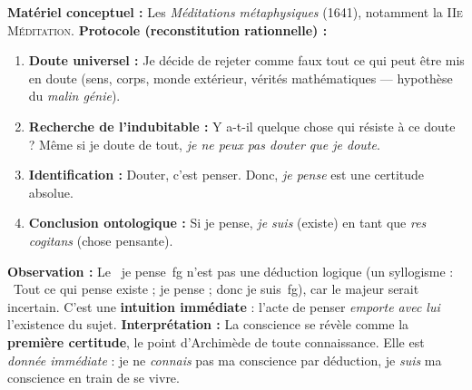 \documentclass[11pt]{article}
\begin{document}
\begin{experience}
\textbf{Matériel conceptuel :} Les \emph{Méditations métaphysiques} (1641), notamment la \textsc{IIe Méditation}.
\textbf{Protocole (reconstitution rationnelle) :}
\begin{enumerate}
    \item \textbf{Doute universel :} Je décide de rejeter comme faux tout ce qui peut être mis en doute (sens, corps, monde extérieur, vérités mathématiques — hypothèse du \emph{malin génie}).
    \item \textbf{Recherche de l'indubitable :} Y a-t-il quelque chose qui résiste à ce doute ? Même si je doute de tout, \emph{je ne peux pas douter que je doute}.
    \item \textbf{Identification :} Douter, c'est penser. Donc, \emph{je pense} est une certitude absolue.
    \item \textbf{Conclusion ontologique :} Si je pense, \emph{je suis} (existe) en tant que \emph{res cogitans} (chose pensante).
\end{enumerate}
\textbf{Observation :} Le \og~je pense~fg{} n'est pas une déduction logique (un syllogisme : \og~Tout ce qui pense existe ; je pense ; donc je suis~fg{}), car le majeur serait incertain. C'est une \textbf{intuition immédiate} : l'acte de penser \emph{emporte avec lui} l'existence du sujet.
\textbf{Interprétation :} La conscience se révèle comme la \textbf{première certitude}, le point d'Archimède de toute connaissance. Elle est \emph{donnée immédiate} : je ne \emph{connais} pas ma conscience par déduction, je \emph{suis} ma conscience en train de se vivre.
\end{experience}
\end{document}
